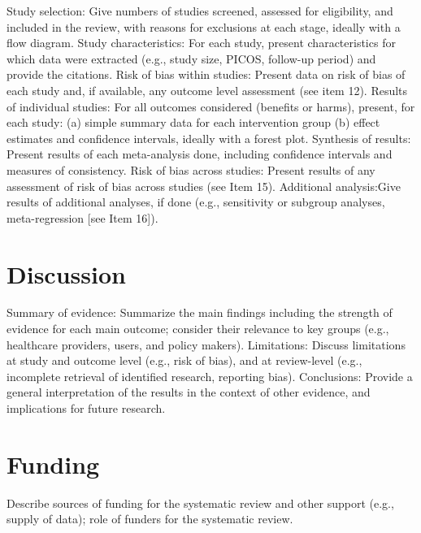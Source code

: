 \documentclass{article}\usepackage[]{graphicx}\usepackage[]{color}
\begin{document}
              Study selection: Give numbers of studies screened, assessed for eligibility, and included in the review, with reasons for exclusions at each stage, ideally with a flow diagram.
              Study characteristics: For each study, present characteristics for which data were extracted (e.g., study size, PICOS, follow-up period) and provide the citations.
              Risk of bias within studies: Present data on risk of bias of each study and, if available, any outcome level assessment (see item 12).
              Results of individual studies: For all outcomes considered (benefits or harms), present, for each study: (a) simple summary data for each intervention group (b) effect estimates and confidence intervals, ideally with a forest plot.
              Synthesis of results: Present results of each meta-analysis done, including confidence intervals and measures of consistency.
              Risk of bias across studies: Present results of any assessment of risk of bias across studies (see Item 15).
              Additional analysis:Give results of additional analyses, if done (e.g., sensitivity or subgroup analyses, meta-regression [see Item 16]).
              

\section{Discussion}

              Summary of evidence: Summarize the main findings including the strength of evidence for each main outcome; consider their relevance to key groups (e.g., healthcare providers, users, and policy makers).
              Limitations: Discuss limitations at study and outcome level (e.g., risk of bias), and at review-level (e.g., incomplete retrieval of identified research, reporting bias).
              Conclusions: Provide a general interpretation of the results in the context of other evidence, and implications for future research.
              

\section{Funding}

Describe sources of funding for the systematic review and other support (e.g., supply of data); role of funders for the systematic review.
                
\end{document}
